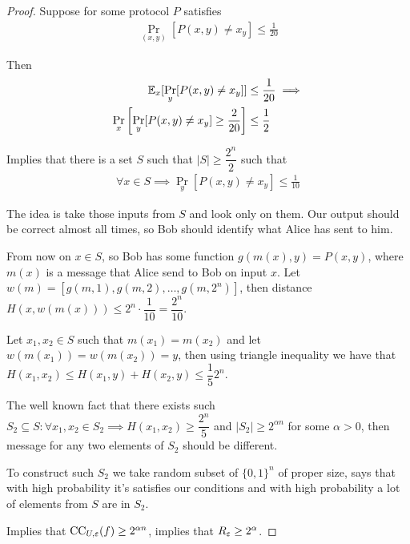 \begin{proof}
	Suppose for some protocol $P$ satisfies
	\begin{align*}
		\Pr_{(x, y)}[P(x, y) \neq x_y] \leq \frac 1 {20}
	\end{align*}
	
	Then
	\begin{align*}
		\mathbb{E}_x[\Pr_y[P(x, y) \neq x_y]] &\leq \frac 1 {20} \implies \\
		\Pr_x\left[\Pr_y[P(x, y) \neq x_y] \geq \frac 2 {20}\right] &\leq \frac 1 2
	\end{align*}
	
	Implies that there is a set $S$ such that $|S| \geq \dfrac {2^n} 2$ such that
	\begin{align*}
		\forall x \in S \implies \Pr_y[P(x, y) \neq x_y] \leq \frac 1 {10}
	\end{align*}
	
	The idea is take those inputs from $S$ and look only on them.
	Our output should be correct almost all times, so Bob should identify what Alice has sent to him.
	
	From now on $x \in S$, so Bob has some function $g(m(x), y) = P(x, y)$, where $m(x)$ is a message that Alice send to Bob on input $x$.
	Let $w(m) = [g(m, 1), g(m, 2), \dots, g(m, 2^n)]$, then distance $H(x, w(m(x))) \leq 2^n \cdot \dfrac 1 {10} = \dfrac {2^n} {10}$.
	
	Let $x_1, x_2 \in S$ such that $m(x_1) = m(x_2)$ and let $w(m(x_1)) = w(m(x_2) ) = y$, then using triangle inequality we have that $H(x_1, x_2) \leq H(x_1, y) + H(x_2, y) \leq \dfrac 1 5 2^n$.
	
	The well known fact that there exists such $S_2 \subseteq S \colon \forall x_1, x_2 \in S_2 \implies H(x_1, x_2) \geq \dfrac {2^n} 5$ and $|S_2| \geq 2^{\alpha n}$ for some $\alpha > 0$, then message for any two elements of $S_2$ should be different.
	
	To construct such $S_2$ we take random subset of $\{0, 1\}^n$ of proper size, says that with high probability it's satisfies our conditions and with high probability a lot of elements from $S$ are in $S_2$.
	
	Implies that $\operatorname{CC}_{U, \varepsilon} (f) \geq 2^{\alpha n}$, implies that $R_\varepsilon \geq 2^\alpha$.
\end{proof}


